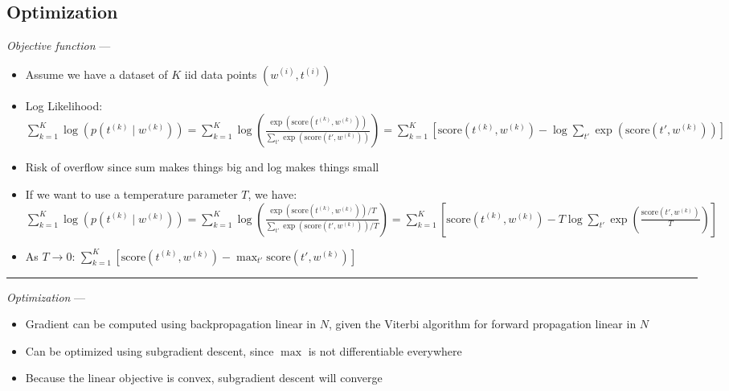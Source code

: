 \subsection*{Optimization}
\emph{Objective function} --- 
\begin{itemize}
    \item Assume we have a dataset of $K$ iid data points $( w^{(i)}, t^{(i)} )$
    \item Log Likelihood:
    $
    \sum_{k=1}^K \log(p(t^{(k)} \mid w^{(k)})) = \sum_{k=1}^K \log \left( \frac{\exp(\textrm{score}(t^{(k)}, w^{(k)}))}{\sum_{t'} \exp(\textrm{score}(t', w^{(k)}))} \right) = \sum_{k=1}^K \left[ \textrm{score}(t^{(k)}, w^{(k)}) - \log \sum_{t'} \exp(\textrm{score}(t', w^{(k)})) \right]
    $
    \item Risk of overflow since sum makes things big and log makes things small
    \item If we want to use a temperature parameter $T$, we have:
    $
    \sum_{k=1}^K \log(p(t^{(k)} \mid w^{(k)})) = \sum_{k=1}^K \log \left( \frac{\exp(\textrm{score}(t^{(k)}, w^{(k)})) / T}{\sum_{t'} \exp(\textrm{score}(t', w^{(k)})) / T} \right) = \sum_{k=1}^K \left[ \textrm{score}(t^{(k)}, w^{(k)}) - T \log \sum_{t'} \exp\left(\frac{\textrm{score}(t', w^{(k)})}{T}\right) \right]
    $
    \item As $T \to 0$:
    $
    \sum_{k=1}^K \left[ \textrm{score}(t^{(k)}, w^{(k)}) - \max_{t'} \textrm{score}(t', w^{(k)}) \right]
    $
\end{itemize}

{\color{lightgray}\hrule height 0.001mm}

\emph{Optimization} ---
\begin{itemize}
    \item Gradient can be computed using backpropagation linear in $N$, given the Viterbi algorithm for forward propagation linear in $N$
    \item Can be optimized using subgradient descent, since $\max$ is not differentiable everywhere
    \item Because the linear objective is convex, subgradient descent will converge
\end{itemize}
